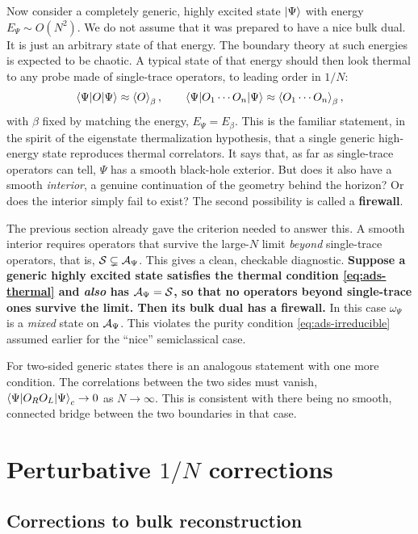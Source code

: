 Now consider a completely generic, highly excited state $\ket\Psi$ with energy $E_\Psi\sim O(N^2)$. We do not
assume that it was prepared to have a nice bulk dual. It is just an arbitrary state of that energy. The
boundary theory at such energies is expected to be chaotic. A typical state of that energy should then look
thermal to any probe made of single-trace operators, to leading order in $1/N$:
\begin{equation}
\braket{\Psi|O|\Psi}\approx\braket{O}_\beta, \qquad \braket{\Psi|O_1\cdots O_n|\Psi}\approx\braket{O_1\cdots
O_n}_\beta ,
\label{eq:ads-thermal}
\end{equation}
with $\beta$ fixed by matching the energy, $E_\Psi=E_\beta$. This is the familiar statement, in the spirit of
the eigenstate thermalization hypothesis, that a single generic high-energy state reproduces thermal
correlators. It says that, as far as single-trace operators can tell, $\Psi$ has a smooth black-hole exterior.
But does it also have a smooth \emph{interior}, a genuine continuation of the geometry behind the horizon? Or
does the interior simply fail to exist? The second possibility is called a \textbf{firewall}.

The previous section already gave the criterion needed to answer this. A smooth interior requires operators
that survive the large-$N$ limit \emph{beyond} single-trace operators, that is, $\mathcal{S}\subsetneq\mathcal{A}_\Psi$. This
gives a clean, checkable diagnostic. \textbf{Suppose a generic highly excited state satisfies the thermal
condition \eqref{eq:ads-thermal} and \emph{also} has $\mathcal{A}_\Psi=\mathcal{S}$, so that no operators beyond single-trace
ones survive the limit. Then its bulk dual has a firewall.} In this case $\omega_\Psi$ is a \emph{mixed} state on
$\mathcal{A}_\Psi$. This violates the purity condition \eqref{eq:ads-irreducible} assumed earlier for the ``nice''
semiclassical case.

For two-sided generic states there is an analogous statement with one more condition. The correlations between
the two sides must vanish, $\braket{\Psi|O_RO_L|\Psi}_c\to0$ as $N\to\infty$. This is consistent with there
being no smooth, connected bridge between the two boundaries in that case.

\section{Perturbative \texorpdfstring{$1/N$}{1/N} corrections}

\subsection*{Corrections to bulk reconstruction}

